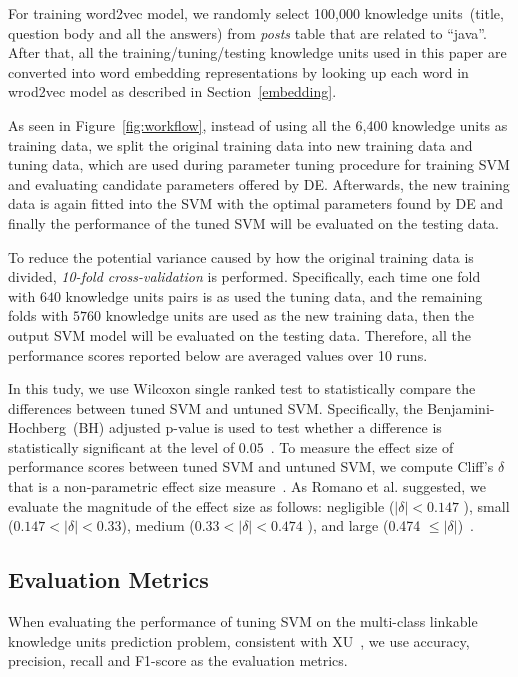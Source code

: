 \documentclass[sigconf,review, anonymous]{acmart}
\theoremstyle{break}
\newcommand{\fig}[1]{Figure~\ref{fig:#1}}
\begin{document}
For training word2vec model, we randomly select 100,000 knowledge
 units~(title, question body and all the answers) from {\it posts} table that are
 related to ``java''. After that, all the training/tuning/testing knowledge units
 used in this paper are converted into word embedding representations by looking up
 each word in wrod2vec model as described in Section~\ref{embedding}.
 
As seen in \fig{workflow}, instead of using all the 6,400 knowledge units as training data, 
we split the original training data into { new training data} and {tuning data}, which are
used during parameter tuning procedure for training SVM and evaluating candidate
parameters offered by DE. Afterwards, the {new training} data is again fitted into the SVM
with the optimal parameters found by DE and finally  the performance of the tuned
SVM will be evaluated on the {testing data}.

To reduce the potential variance caused
by how the original training data is divided, {\it 10-fold cross-validation} is performed. Specifically, 
each time one fold with $640$ knowledge units pairs is as used the tuning data, and the remaining folds with $5760$
knowledge units are used as  the new training data, then the output SVM model will be evaluated on the testing data. Therefore,
all the performance scores reported below are averaged values over 10 runs.


In this tudy, we use Wilcoxon single ranked test to statistically compare
the differences between tuned SVM and untuned SVM.
Specifically, the Benjamini-Hochberg~(BH) adjusted p-value 
is used to test whether a difference is statistically significant
at the level of $0.05$~\cite{benjamini1995controlling}. 
To measure the effect size of performance scores between tuned SVM and untuned SVM,
we compute Cliff's $\delta$ that is a non-parametric effect size measure~\cite{romano2006exploring}.
As Romano et al. suggested, we evaluate the magnitude of the effect size as follows:
negligible ($|\delta|<0.147$ ), small ($ 0.147<|\delta|<0.33$), medium ($0.33<|\delta|<0.474$ ), and large (0.474 $\leq|\delta|$)~\cite{romano2006exploring}.



\subsection{Evaluation Metrics}
When evaluating the performance of tuning SVM on the
multi-class linkable knowledge units prediction problem,
consistent with XU~\cite{xu2016predicting}, we use accuracy, precision, recall and F1-score
as the evaluation metrics.
\end{document}
